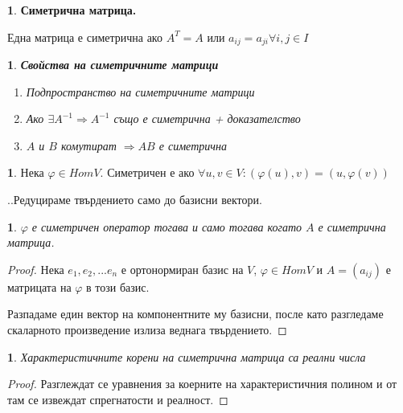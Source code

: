 \documentclass[11pt]{article}
\numberwithin{equation}{section}
\numberwithin{figure}{section}
\numberwithin{table}{section}
\theoremstyle{plain}
\theoremstyle{definition}
\newtheorem{defn}[thm]{\protect\definitionname}
\theoremstyle{remark}
\theoremstyle{definition}
\theoremstyle{remark}
\theoremstyle{plain}
\theoremstyle{definition}
\theoremstyle{definition}
\theoremstyle{plain}
\theoremstyle{plain}
\newtheorem{prop}[thm]{\protect\propositionname}
\theoremstyle{plain}
\theoremstyle{definition}
\theoremstyle{plain}
\providecommand{\definitionname}{Дефиниция}
\providecommand{\propositionname}{Твърдение}
\begin{document}
\begin{defn}
\textbf{Симетрична матрица.}

Една матрица е симетрична ако $A^T = A$ или $a_{ij} = a_{ji} \forall i,j \in I$
\end{defn}

\begin{prop}
\textbf{Свойства на симетричните матрици}
\begin{enumerate}
\item Подпространство на симетричните матрици
\item Ако $\exists A^{-1} \Rightarrow A^{-1}$ също е симетрична + доказателство
\item $A$ и $B$ комутират $\Rightarrow AB$ е симетрична
\end{enumerate}
\end{prop}

\begin{defn}
Нека $\varphi \in HomV$. Симетричен е ако $\forall u,v \in V : (\varphi(u),v) = (u,\varphi(v))$
\end{defn}

..Редуцираме твърдението само до базисни вектори.

\begin{prop}
$\varphi$ е симетричен оператор тогава и само тогава когато $A$ е симетрична матрица.
\end{prop}
\begin{proof}
Нека $e_1, e_2, ... e_n$ е ортонормиран базис на $V$, $\varphi \in HomV$ и $A = (a_{ij})$ е матрицата на $\varphi$ в този базис.

Разпадаме един вектор на компонентните му базисни, после като разгледаме скаларното произведение излиза веднага твърдението.
\end{proof}

\begin{prop}
Характеристичните корени на симетрична матрица са реални числа
\end{prop}
\begin{proof}
Разглеждат се уравнения за коерните на характеристичния полином и от там се извеждат спрегнатости и реалност.
\end{proof}
\end{document}
